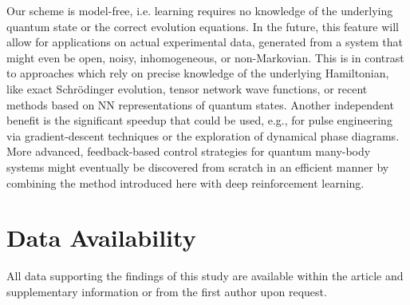 \documentclass[a4paper,aps,amsmath,amssymb,twocolumn,longbibliography,,accepted=2022-05-17]{quantumarticle}
\begin{document}

Our scheme is model-free, i.e. learning requires no knowledge of the underlying quantum state or the correct evolution equations. In the future, this feature will allow for applications on actual experimental data, generated from a system that might even be open, noisy, inhomogeneous, or non-Markovian. This is in contrast to approaches which rely on precise knowledge of the underlying Hamiltonian, like exact Schr\"odinger evolution, tensor network wave functions, or recent methods based on NN representations of quantum states. Another independent benefit is the significant speedup that could be used, e.g., for pulse engineering via gradient-descent techniques or the exploration of dynamical phase diagrams. More advanced, feedback-based control strategies for quantum many-body systems might eventually be discovered from scratch in an efficient manner by combining the method introduced here with deep reinforcement learning.




\section*{Data Availability}
All data supporting the findings of this study are available within the article and supplementary information or from the first author upon request.
\end{document}
